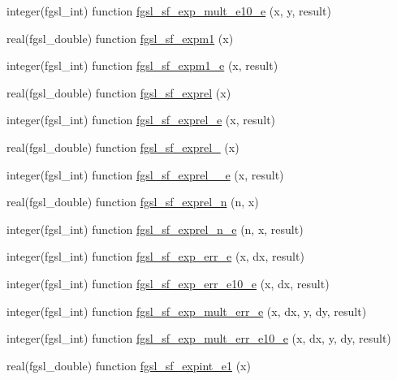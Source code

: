\begin{DoxyCompactItemize}
\item 
integer(fgsl\-\_\-int) function \hyperlink{specfunc_8finc_a1a3354d6af9718cbbe9d95f41f2b9cd1}{fgsl\-\_\-sf\-\_\-exp\-\_\-mult\-\_\-e10\-\_\-e} (x, y, result)
\item 
real(fgsl\-\_\-double) function \hyperlink{specfunc_8finc_ad0a937e1ec4b7bdea2b628caf271786d}{fgsl\-\_\-sf\-\_\-expm1} (x)
\item 
integer(fgsl\-\_\-int) function \hyperlink{specfunc_8finc_ada0379a9eba99de7dcf4410f332c74f3}{fgsl\-\_\-sf\-\_\-expm1\-\_\-e} (x, result)
\item 
real(fgsl\-\_\-double) function \hyperlink{specfunc_8finc_ababb3e3014171c0edf9bfd8625c06998}{fgsl\-\_\-sf\-\_\-exprel} (x)
\item 
integer(fgsl\-\_\-int) function \hyperlink{specfunc_8finc_aee95356cdffdb3e951e2b3219a1329ef}{fgsl\-\_\-sf\-\_\-exprel\-\_\-e} (x, result)
\item 
real(fgsl\-\_\-double) function \hyperlink{specfunc_8finc_a1e868f3537cdc53fd75dc0e4d56942f8}{fgsl\-\_\-sf\-\_\-exprel\-\_} (x)
\item 
integer(fgsl\-\_\-int) function \hyperlink{specfunc_8finc_a584638727a909890e63dd80afd9f1de2}{fgsl\-\_\-sf\-\_\-exprel\-\_\-\_\-e} (x, result)
\item 
real(fgsl\-\_\-double) function \hyperlink{specfunc_8finc_aa1f4b697cbf2127882f14148eac03980}{fgsl\-\_\-sf\-\_\-exprel\-\_\-n} (n, x)
\item 
integer(fgsl\-\_\-int) function \hyperlink{specfunc_8finc_ae45756713b8e1fadad813ec51929beeb}{fgsl\-\_\-sf\-\_\-exprel\-\_\-n\-\_\-e} (n, x, result)
\item 
integer(fgsl\-\_\-int) function \hyperlink{specfunc_8finc_a27bd49c119d2e56693ed8f12a824d1a1}{fgsl\-\_\-sf\-\_\-exp\-\_\-err\-\_\-e} (x, dx, result)
\item 
integer(fgsl\-\_\-int) function \hyperlink{specfunc_8finc_ad8c7fec7d48cadf94025121c8c5bc735}{fgsl\-\_\-sf\-\_\-exp\-\_\-err\-\_\-e10\-\_\-e} (x, dx, result)
\item 
integer(fgsl\-\_\-int) function \hyperlink{specfunc_8finc_a6bef4e16739c2e191a1767d9c871935e}{fgsl\-\_\-sf\-\_\-exp\-\_\-mult\-\_\-err\-\_\-e} (x, dx, y, dy, result)
\item 
integer(fgsl\-\_\-int) function \hyperlink{specfunc_8finc_a6480d8ed6eb0074e26773f375d6379e0}{fgsl\-\_\-sf\-\_\-exp\-\_\-mult\-\_\-err\-\_\-e10\-\_\-e} (x, dx, y, dy, result)
\item 
real(fgsl\-\_\-double) function \hyperlink{specfunc_8finc_af3fd73541cafadd5f25039bdc364e01e}{fgsl\-\_\-sf\-\_\-expint\-\_\-e1} (x)

\end{DoxyCompactItemize}
